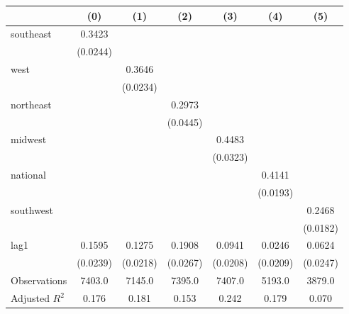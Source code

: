 \begin{tabular}{lcccccc}
\toprule
 & (0) & (1) & (2) & (3) & (4) & (5) \\
\midrule
southeast & 0.3423 &  &  &  &  &  \\
\vspace{0.2cm}
 & (0.0244) &  &  &  &  &  \\
west &  & 0.3646 &  &  &  &  \\
\vspace{0.2cm}
 &  & (0.0234) &  &  &  &  \\
northeast &  &  & 0.2973 &  &  &  \\
\vspace{0.2cm}
 &  &  & (0.0445) &  &  &  \\
midwest &  &  &  & 0.4483 &  &  \\
\vspace{0.2cm}
 &  &  &  & (0.0323) &  &  \\
national &  &  &  &  & 0.4141 &  \\
\vspace{0.2cm}
 &  &  &  &  & (0.0193) &  \\
southwest &  &  &  &  &  & 0.2468 \\
\vspace{0.2cm}
 &  &  &  &  &  & (0.0182) \\
lag1 & 0.1595 & 0.1275 & 0.1908 & 0.0941 & 0.0246 & 0.0624 \\
\vspace{0.2cm}
 & (0.0239) & (0.0218) & (0.0267) & (0.0208) & (0.0209) & (0.0247) \\
\midrule
Observations & 7403.0 & 7145.0 & 7395.0 & 7407.0 & 5193.0 & 3879.0 \\
Adjusted $R^2$ & 0.176 & 0.181 & 0.153 & 0.242 & 0.179 & 0.070 \\
\bottomrule
\end{tabular}